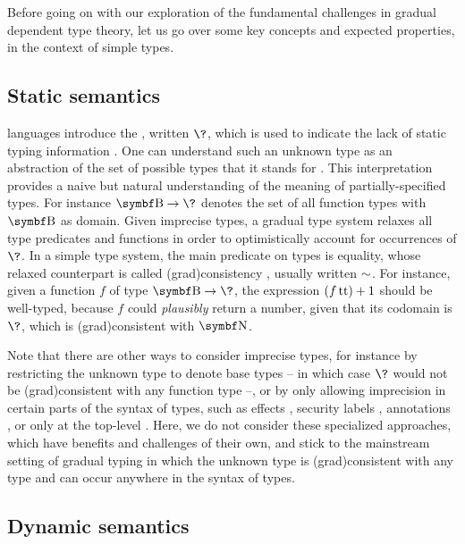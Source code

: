 Before going on with our exploration of the fundamental challenges in gradual dependent type
theory, let us go over some key concepts and expected properties,
in the context of simple types.

\subsection{Static semantics}

\AP {} languages introduce the
, written $\?$,
which is used to indicate the lack of static typing information .
One can understand such an unknown type as an abstraction of the
set of possible types that it stands for .
This interpretation provides a naive but natural understanding of the meaning of
partially-specified types. For instance $\Bool \to \?$ denotes the set of all function types
with $\Bool$ as domain.
Given imprecise types, a gradual type system relaxes all type predicates and functions in order
to optimistically account for occurrences of $\?$.
In a simple type system, the main predicate on types is equality, whose relaxed counterpart is called \intro(grad){consistency}%
,
usually written $\sim$.
For instance, given a function $f$ of type $\Bool \to \?$, the expression $(f \operatorname{tt}) + 1$
should be well-typed, because $f$ could \emph{plausibly} return a number,
given that its codomain is $\?$, which is \kl(grad){consistent} with $\Nat$.

Note that there are other ways to consider imprecise types, for instance by restricting the
unknown type to denote base types – in which case $\?$ would not be \kl(grad){consistent} with any
function type –, or by only allowing imprecision in certain parts of the syntax of types,
such as effects , security labels
, annotations ,
or only at the top-level .
Here, we do not consider these specialized approaches, which have benefits and challenges
of their own, and stick to the mainstream setting of gradual typing
in which the unknown type is \kl(grad){consistent} with any type and can occur
anywhere in the syntax of types.

\subsection{Dynamic semantics}

